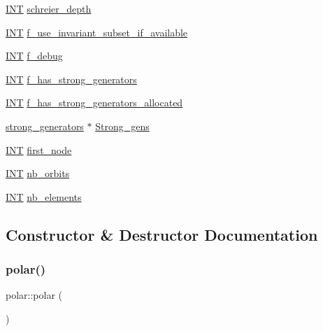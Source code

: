 \begin{DoxyCompactItemize}
\item 
\mbox{\hyperlink{galois_8h_a09fddde158a3a20bd2dcadb609de11dc}{I\+NT}} \mbox{\hyperlink{classpolar_a60ff5ac445ba413eecd4aaea181ad1c2}{schreier\+\_\+depth}}
\item 
\mbox{\hyperlink{galois_8h_a09fddde158a3a20bd2dcadb609de11dc}{I\+NT}} \mbox{\hyperlink{classpolar_a78a781749e1cf3990b5ac194194514ab}{f\+\_\+use\+\_\+invariant\+\_\+subset\+\_\+if\+\_\+available}}
\item 
\mbox{\hyperlink{galois_8h_a09fddde158a3a20bd2dcadb609de11dc}{I\+NT}} \mbox{\hyperlink{classpolar_aec0978513fbf17be8e2933e2886c59a0}{f\+\_\+debug}}
\item 
\mbox{\hyperlink{galois_8h_a09fddde158a3a20bd2dcadb609de11dc}{I\+NT}} \mbox{\hyperlink{classpolar_a2f4ba65c27eb6c6ec9c43db8f7162dfb}{f\+\_\+has\+\_\+strong\+\_\+generators}}
\item 
\mbox{\hyperlink{galois_8h_a09fddde158a3a20bd2dcadb609de11dc}{I\+NT}} \mbox{\hyperlink{classpolar_a4f264a09ad8f9436c0c03c414b1ce8d5}{f\+\_\+has\+\_\+strong\+\_\+generators\+\_\+allocated}}
\item 
\mbox{\hyperlink{classstrong__generators}{strong\+\_\+generators}} $\ast$ \mbox{\hyperlink{classpolar_aa8a062b61564a2d8c859e8ea9f54efa9}{Strong\+\_\+gens}}
\item 
\mbox{\hyperlink{galois_8h_a09fddde158a3a20bd2dcadb609de11dc}{I\+NT}} \mbox{\hyperlink{classpolar_a294033afe0a9a4fddad79ea366c864f8}{first\+\_\+node}}
\item 
\mbox{\hyperlink{galois_8h_a09fddde158a3a20bd2dcadb609de11dc}{I\+NT}} \mbox{\hyperlink{classpolar_a516ad1db4c822f72ecfdced61d63258e}{nb\+\_\+orbits}}
\item 
\mbox{\hyperlink{galois_8h_a09fddde158a3a20bd2dcadb609de11dc}{I\+NT}} \mbox{\hyperlink{classpolar_a3078c99a8796a894bdd4cdb20d576d58}{nb\+\_\+elements}}
\end{DoxyCompactItemize}


\subsection{Constructor \& Destructor Documentation}
\mbox{\label{classpolar_a26d3263474b5702ee2083e39decd8aa5}} 
\subsubsection{\texorpdfstring{polar()}{polar()}}
{\footnotesize\ttfamily polar\+::polar (\begin{DoxyParamCaption}{ }\end{DoxyParamCaption})}

